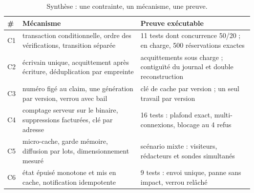\begin{table}[H]
\centering
\small
\begin{tabular}{@{}p{0.7cm}p{5.6cm}p{8.7cm}@{}}
\toprule
\textbf{\#} & \textbf{Mécanisme} & \textbf{Preuve exécutable} \\
\midrule
C1 & transaction conditionnelle, ordre des vérifications, transition séparée
   & 11 tests dont concurrence 50/20 ; en charge, 500 réservations exactes \\
\addlinespace
C2 & écrivain unique, acquittement après écriture, déduplication par empreinte
   & acquittements sous charge ; contiguïté du journal et double reconstruction \\
\addlinespace
C3 & numéro figé au claim, une génération par version, verrou avec bail
   & clé de cache par version ; un seul travail par version \\
\addlinespace
C4 & comptage serveur sur le binaire, suppressions facturées, clé par adresse
   & 16 tests : plafond exact, multi-connexions, blocage au 4\up{e} refus \\
\addlinespace
C5 & micro-cache, garde mémoire, diffusion par lots, dimensionnement mesuré
   & scénario mixte : visiteurs, rédacteurs et sondes simultanés \\
\addlinespace
C6 & état épuisé monotone et mis en cache, notification idempotente
   & 9 tests : envoi unique, panne sans impact, verrou relâché \\
\bottomrule
\end{tabular}
\caption{Synthèse : une contrainte, un mécanisme, une preuve.}
\label{tab:synthese-contraintes}
\end{table}
